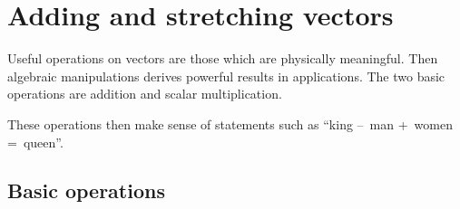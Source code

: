
\section{Adding and stretching vectors}
\label{sec:asv}
\secttoc


Useful operations on vectors are those which are physically meaningful.
Then algebraic manipulations derives powerful results in applications.
The two basic operations are addition and scalar multiplication.

These operations then make sense of statements such as ``king --~man +~women =~queen''.

\subsection{Basic operations}

